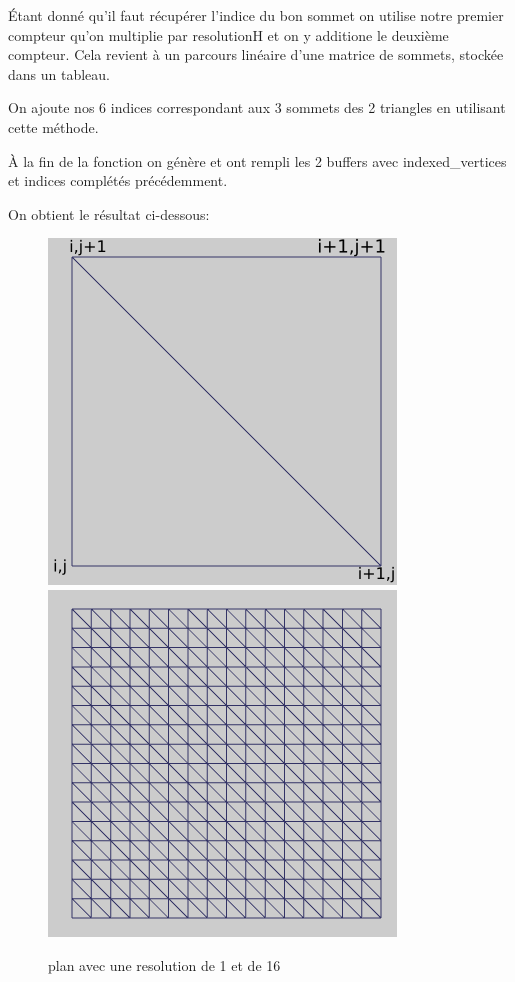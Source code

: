 \documentclass{article}
\begin{document}
Étant donné qu'il faut récupérer l'indice du bon sommet on utilise notre premier compteur qu'on multiplie par resolutionH et on y additione le deuxième compteur.
Cela revient à un parcours linéaire d'une matrice de sommets, stockée dans un tableau. 

On ajoute nos 6 indices correspondant aux 3 sommets des 2 triangles en utilisant cette méthode.

À la fin de la fonction on génère et ont rempli les 2 buffers avec indexed\_vertices et indices complétés précédemment.
\newpage


On obtient le résultat ci-dessous:
\begin{figure}[h!]
\centerline{ \includegraphics[scale=0.5]{./rendus/plan1.png} \includegraphics[scale=0.5]{./rendus/plan.png} }
\caption{plan avec une resolution de 1 et de 16} 
\end{figure}
\end{document}
